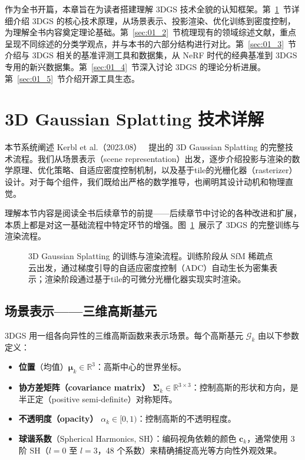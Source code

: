 作为全书开篇，本章旨在为读者搭建理解 3DGS 技术全貌的认知框架。第~\ref{sec:01_1}~节详细介绍 3DGS 的核心技术原理，从场景表示、投影渲染、优化训练到密度控制，为理解全书内容奠定理论基础。第~\ref{sec:01_2}~节梳理现有的领域综述文献，重点呈现不同综述的分类学观点，并与本书的六部分结构进行对比。第~\ref{sec:01_3}~节介绍与 3DGS 相关的基准评测工具和数据集，从 NeRF 时代的经典基准到 3DGS 专用的新兴数据集。第~\ref{sec:01_4}~节深入讨论 3DGS 的理论分析进展。第~\ref{sec:01_5}~节介绍开源工具生态。

\section{3D Gaussian Splatting 技术详解}
\label{sec:01_1}

本节系统阐述 Kerbl et al.（2023.08）~\cite{2308_04079} 提出的 3D Gaussian Splatting 的完整技术流程。我们从场景表示（scene representation）出发，逐步介绍投影与渲染的数学原理、优化策略、自适应密度控制机制，以及基于tile的光栅化器（rasterizer）设计。对于每个组件，我们既给出严格的数学推导，也阐明其设计动机和物理直觉。

理解本节内容是阅读全书后续章节的前提——后续章节中讨论的各种改进和扩展，本质上都是对这一基础流程中特定环节的增强。图~\ref{fig:01_pipeline}~展示了 3DGS 的完整训练与渲染流程。

\begin{figure}[htbp]
\centering
\resizebox{0.75\textwidth}{!}{}
\caption{3D Gaussian Splatting 的训练与渲染流程。训练阶段从 SfM 稀疏点云出发，通过梯度引导的自适应密度控制（ADC）自动生长为密集表示；渲染阶段通过基于tile的可微分光栅化器实现实时渲染。}
\label{fig:01_pipeline}
\end{figure}

\subsection{场景表示——三维高斯基元}
\label{sec:01_1_1}

3DGS 用一组各向异性的三维高斯函数来表示场景。每个高斯基元 $\mathcal{G}_k$ 由以下参数定义：
\begin{itemize}
\item \textbf{位置}（均值）$\boldsymbol{\mu}_k \in \mathbb{R}^3$：高斯中心的世界坐标。
\item \textbf{协方差矩阵（covariance matrix）} $\boldsymbol{\Sigma}_k \in \mathbb{R}^{3 \times 3}$：控制高斯的形状和方向，是半正定（positive semi-definite）对称矩阵。
\item \textbf{不透明度（opacity）} $\alpha_k \in [0, 1)$：控制高斯的不透明程度。
\item \textbf{球谐系数}（Spherical Harmonics, SH）：编码视角依赖的颜色 $\mathbf{c}_k$，通常使用 3 阶 SH（$l=0$ 至 $l=3$，48 个系数）来精确捕捉高光等方向性外观效果。
\end{itemize}


